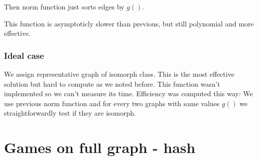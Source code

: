 Then norm function just sorts edges by $g()$.

This function is asymptoticly slower than previous, but still polynomial
and more effective.

\subsubsection{Ideal case} 
We assign representative graph of isomorph class.
This is the most effective solution but hard to compute as we noted before.
This function wasn't implemented so we can't measure its time.
Efficiency was computed this way: We use previous norm function
and for every two graphs with same values $g()$ we straightforwardly test 
if they are isomorph. 

\section{ Games on full graph - hash } 




